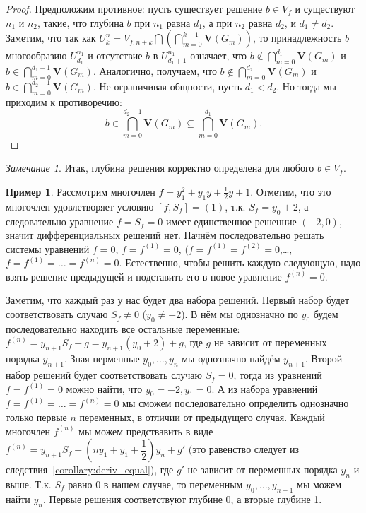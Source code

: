 \documentclass[16pt]{article}
\theoremstyle{plain1}
\theoremstyle{plain2}
\theoremstyle{plain}
\theoremstyle{plain3}
\theoremstyle{definition}
\newtheorem{example}[theorem3]{Пример}
\theoremstyle{remark}
\newtheorem{remark}[theorem1]{Замечание}
\begin{document}
\begin{proof}
Предположим противное: пусть существует решение $b\in{V}_f$ и существуют $n_1$ и $n_2$, такие, что глубина $b$ при $n_1$ равна $d_1$, а при $n_2$ равна $d_2$, и $d_1\not=d_2$. Заметим, что так как ${U}_k^n={V}_{f,n+k}\bigcap\left(\bigcap\limits_{m=0}^{k-1}\mathbf{V}\left(G_m\right)\right)$, то принадлежность $b$  многообразию ${U}_{d_1}^{n_1}$ и отсутствие $b$ в ${U}_{d_1+1}^{n_1}$ означает, что $b\not\in\bigcap\limits_{m=0}^{d_1}\mathbf{V}\left(G_m\right)$ и $b\in\bigcap\limits_{m=0}^{d_1-1}\mathbf{V}\left(G_m\right)$. Аналогично, получаем, что $b\not\in\bigcap\limits_{m=0}^{d_2}\mathbf{V}\left(G_m\right)$ и $b\in\bigcap\limits_{m=0}^{d_2-1}\mathbf{V}\left(G_m\right)$. Не ограничивая общности, пусть $d_1<d_2$. Но тогда мы приходим к противоречию: 
$$
b\in\bigcap\limits_{m=0}^{d_2-1}\mathbf{V}\left(G_m\right)\subseteq\bigcap\limits_{m=0}^{d_1}\mathbf{V}\left(G_m\right).
$$
\end{proof}

\begin{remark}\label{remark:o_sushestvovanii_gllubiny} Итак, глубина решения корректно определена для любого $b\in {V}_f$.
\end{remark}
\begin{example}
Рассмотрим многочлен $f=y_1^2+y_1y+\frac{1}{2}y+1$. Отметим, что это многочлен удовлетворяет условию $[f,S_f]=(1)$, т.к. $S_f=y_0+2$, а следовательно уравнение $f=S_f=0$ имеет единственное решенние $(-2,0)$, значит дифференциальных решений нет. Начнём последовательно решать системы уравнений $f=0$, $f=f^{(1)}=0$, $(f=f^{(1)}=f^{(2)}=0$,\ldots,$f=f^{(1)}=\ldots=f^{(n)}=0$. Естественно, чтобы решить каждую следующую, надо взять решение предыдущей и подставить его в новое уравнение $f^{(n)}=0$. 

Заметим, что каждый раз у нас будет два набора решений. Первый набор будет соответствовать случаю $S_f\ne 0$ ($y_0\ne -2$). В нём мы однозначно  по $y_0$ будем последовательно  находить все остальные переменные:   $f^{(n)}=y_{n+1}S_f+g=y_{n+1}(y_0+2)+g$, где  $g$ не зависит от переменных порядка $y_{n+1}$. Зная  перменные $y_0,\ldots,y_n$ мы однозначно найдём $y_{n+1}$. Второй набор решений будет соответствовать  случаю $S_f=0$, тогда из уравнений $f=f^{(1)}=0$ можно найти, что $y_0=-2,y_1=0$. А из набора уравнений  $f=f^{(1)}=\ldots=f^{(n)}=0$ мы сможем последовательно определить однозначно только первые $n$ переменных, в отличии от предыдущего случая. Каждый  многочлен $f^{(n)}$ мы можем предствавить в виде $f^{(n)}=y_{n+1}S_f+(ny_1+y_1+\dfrac{1}{2})y_n+g'$ (это равенство следует из  следствия~\ref{corollary:deriv_equal}), где  $g'$ не зависит от переменных порядка $y_{n}$ и выше. Т.к. $S_f$ равно 0 в нашем случае, то переменным $y_0,\ldots,y_{n-1}$ мы можем найти $y_n$. Первые решения соответствуют глубине 0, а вторые глубине 1.

\end{example}
\end{document}
